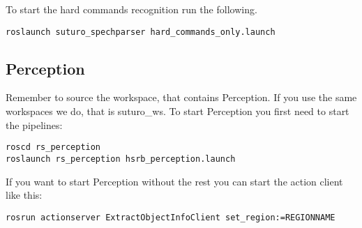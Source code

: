 \documentclass[main.tex]{subfiles}
\begin{document}
	To start the hard commands recognition run the following.\\
	
	\begin{lstlisting}
roslaunch suturo_spechparser hard_commands_only.launch
\end{lstlisting}
	
	\subsection{Perception}
	Remember to source the workspace, that contains Perception.
	If you use the same workspaces we do, that is suturo\_ws.
	To start Perception you first need to start the pipelines:\\
	\begin{lstlisting}
roscd rs_perception
roslaunch rs_perception hsrb_perception.launch
\end{lstlisting}	

If you want to start Perception without the rest you can start the action client like this:\\
\begin{lstlisting}
rosrun actionserver ExtractObjectInfoClient set_region:=REGIONNAME
\end{lstlisting}
\end{document}
